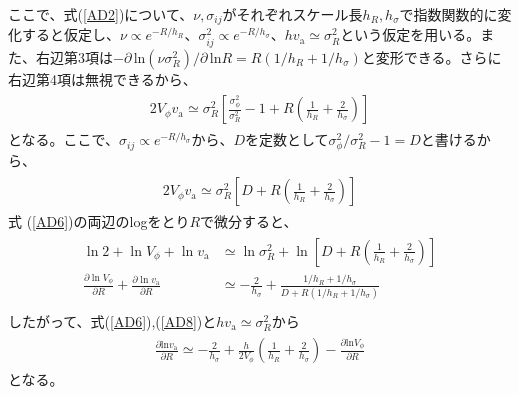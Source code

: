 ここで、式(\ref{AD2})について、$\nu,\sigma_{ij}$がそれぞれスケール長$h_R,h_{\sigma}$で指数関数的に変化すると仮定し、$\nu \propto e^{
-R/h_R}、\sigma_{ij}^2 \propto e^{-R/h_{\sigma}}、hv_{\mathrm{a}} \simeq \sigma_{R}^2$という仮定を用いる。また、右辺第3項は$-\partial\,\mathrm{ln}(\nu \sigma_R^2)/\partial\,\mathrm{ln} R = R(1/h_R + 1/h_{\sigma})$と変形できる。さらに右辺第4項は無視できるから、
\begin{align}
\begin{aligned}
    2V_{\phi}v_{\mathrm{a}} \simeq \sigma_R^2 \left[\frac{\sigma_{\phi}^2}{\sigma_R^2} - 1 + R\left(\frac{1}{h_R} + \frac{2}{h_{\sigma}}\right)\right]
\end{aligned} \label{AD5}
\end{align}
となる。ここで、$\sigma_{ij} \propto e^{-R/h_{\sigma}}$から、$D$を定数として$\sigma_{\phi}^2/\sigma_R^2 - 1 = D$と書けるから、
\begin{align}
\begin{aligned}
    2V_{\phi}v_{\mathrm{a}} \simeq \sigma_R^2 \left[D + R\left(\frac{1}{h_R} + \frac{2}{h_{\sigma}}\right)\right]
\end{aligned} \label{AD6}
\end{align}
式 (\ref{AD6})の両辺のlogをとり$R$で微分すると、
\begin{align}
\begin{aligned}
    \ln2+\ln V_{\phi}+\ln v_{\mathrm{a}} &\simeq \ln \sigma_R^2 +\ln \left[D + R\left(\frac{1}{h_R} + \frac{2}{h_{\sigma}}\right)\right] \\
    \frac{\partial \ln V_{\phi}}{\partial R}+\frac{\partial \ln v_{\mathrm{a}}}{\partial R} &\simeq -\frac{2}{h_{\sigma}} + \frac{1/h_R + 1/h_{\sigma}}{D +R\left(1/h_R + 1/h_{\sigma}\right)} \\
\end{aligned} \label{AD8}
\end{align}
したがって、式(\ref{AD6}),(\ref{AD8})と$hv_{\mathrm{a}} \simeq \sigma_R^2$から
\begin{align}
\begin{aligned}
    \frac{\partial \mathrm{ln}v_{\mathrm{a}}}{\partial R} \simeq -\frac{2}{h_{\sigma}} + \frac{h}{2V_{\phi}}\left(\frac{1}{h_R} + \frac{2}{h_{\sigma}}\right) - \frac{\partial \mathrm{ln}V_{\phi}}{\partial R}
\end{aligned} \label{AD9}
\end{align}
となる。

